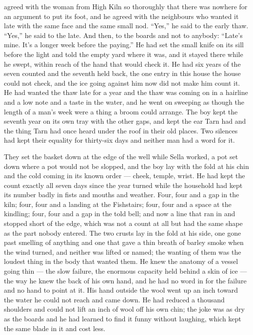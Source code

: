  agreed with the woman from High Kiln so thoroughly that there was nowhere for an argument to put its foot, and he agreed with the neighbours who wanted it late with the same face and the same small nod. “Yes,” he said to the early thaw. “Yes,” he said to the late. And then, to the boards and not to anybody: “Late's mine. It's a longer week before the paying.” He had set the small knife on its sill before the light and told the empty yard where it was, and it stayed there while he swept, within reach of the hand that would check it. He had six years of the seven counted and the seventh held back, the one entry in this house the house could not check, and the ice going against him now did not make him count it. He had wanted the thaw late for a year and the thaw was coming on in a hairline and a low note and a taste in the water, and he went on sweeping as though the length of a man's week were a thing a broom could arrange. The boy kept the seventh year on its own tray with the other gaps, and kept the ear Tarn had and the thing Tarn had once heard under the roof in their old places. Two silences had kept their equality for thirty-six days and neither man had a word for it.

\scenebreak

They set the basket down at the edge of the well while Sella worked, a pot set down where a pot would not be slopped, and the boy lay with the fold at his chin and the cold coming in its known order --- cheek, temple, wrist. He had kept the count exactly all seven days since the year turned while the household had kept its number badly in fists and mouths and weather. Four, four and a gap in the kiln; four, four and a landing at the Fishstairs; four, four and a space at the kindling; four, four and a gap in the told bell; and now a line that ran in and stopped short of the edge, which was not a count at all but had the same shape as the part nobody entered. The two crusts lay in the fold at his side, one gone past smelling of anything and one that gave a thin breath of barley smoke when the wind turned, and neither was lifted or named; the wanting of them was the loudest thing in the body that wanted them. He knew the anatomy of a vessel going thin --- the slow failure, the enormous capacity held behind a skin of ice --- the way he knew the back of his own hand, and he had no word in  for the failure and no hand to point at it. His hand outside the wool went up an inch toward the water he could not reach and came down. He had reduced a thousand shoulders and could not lift an inch of wool off his own chin; the joke was as dry as the boards and he had learned to find it funny without laughing, which kept the same blade in it and cost less.

